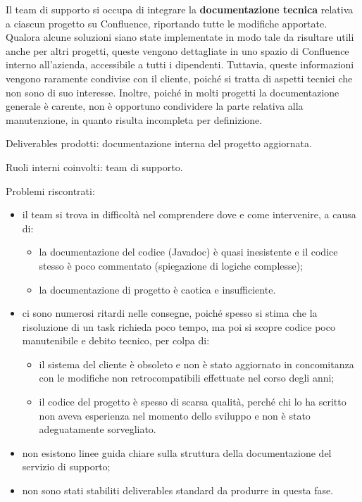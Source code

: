     Il team di supporto si occupa di integrare la \textbf{documentazione tecnica} relativa a ciascun progetto su Confluence, riportando tutte le modifiche apportate.
    Qualora alcune soluzioni siano state implementate in modo tale da risultare utili anche per altri progetti, queste vengono dettagliate in uno spazio di Confluence
    interno all’azienda, accessibile a tutti i dipendenti. Tuttavia, queste informazioni vengono raramente condivise con il cliente, poiché si tratta di aspetti
    tecnici che non sono di suo interesse. Inoltre, poiché in molti progetti la documentazione generale è carente, non è opportuno condividere la parte relativa alla
    manutenzione, in quanto risulta incompleta per definizione.

    Deliverables prodotti: documentazione interna del progetto aggiornata.

    Ruoli interni coinvolti: team di supporto.

    Problemi riscontrati:
    \begin{itemize}
        \item il team si trova in difficoltà nel comprendere dove e come intervenire, a causa di:
            \begin{itemize}
                \item la documentazione del codice (Javadoc) è quasi inesistente e il codice stesso è poco commentato (spiegazione di logiche complesse);
                \item la documentazione di progetto è caotica e insufficiente.
            \end{itemize}
        \item ci sono numerosi ritardi nelle consegne, poiché spesso si stima che la risoluzione di un task richieda poco tempo,
        ma poi si scopre codice poco manutenibile e debito tecnico, per colpa di:
            \begin{itemize}
                \item il sistema del cliente è obsoleto e non è stato aggiornato in concomitanza con le modifiche non retrocompatibili effettuate nel corso degli anni;
                \item il codice del progetto è spesso di scarsa qualità, perché chi lo ha scritto non aveva esperienza nel momento dello sviluppo e non è stato adeguatamente sorvegliato.
            \end{itemize}
        \item non esistono linee guida chiare sulla struttura della documentazione del servizio di supporto;
        \item non sono stati stabiliti deliverables standard da produrre in questa fase.
    \end{itemize}

